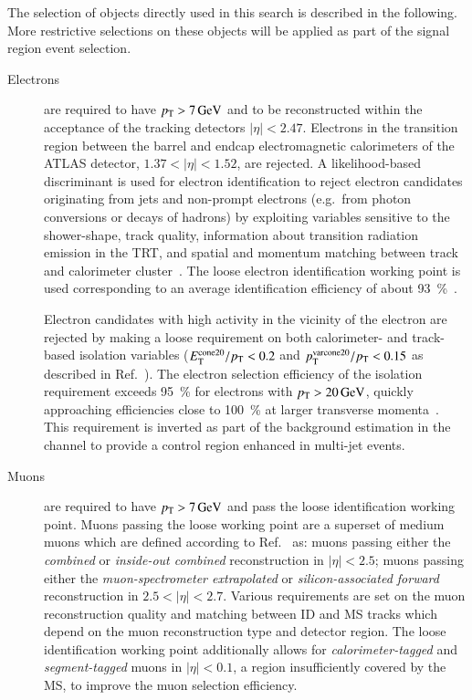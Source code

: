 The selection of objects directly used in this search is described in
the following. More restrictive selections on these objects will be
applied as part of the signal region event selection.
\begin{description}

\item[Electrons] are required to have $\pT > \SI{7}{\GeV}$ and to be
  reconstructed within the acceptance of the tracking detectors
  $|\eta| < \num{2.47}$. Electrons in the transition region between
  the barrel and endcap electromagnetic calorimeters of the ATLAS
  detector, $1.37 < |\eta| < 1.52$, are rejected. A likelihood-based
  discriminant is used for electron identification to reject electron
  candidates originating from jets and non-prompt electrons (e.g.\
  from photon conversions or decays of hadrons) by exploiting
  variables sensitive to the shower-shape, track quality, information
  about transition radiation emission in the TRT, and spatial and
  momentum matching between track and calorimeter
  cluster~\cite{EGAM-2018-01}. The loose electron identification
  working point is used corresponding to an average identification
  efficiency of about \SI{93}{\percent}~\cite{EGAM-2018-01}.

  Electron candidates with high activity in the vicinity of the
  electron are rejected by making a loose requirement on both
  calorimeter- and track-based isolation variables
  ($E_{\text{T}}^\text{cone20} / p_{\text{T}} < 0.2$ and
  $p_{\text{T}}^{\text{varcone20}}/ p_{\text{T}} < 0.15$ as described in
  Ref.~\cite{EGAM-2018-01}). The electron selection efficiency of the
  isolation requirement exceeds \SI{95}{\percent} for electrons with
  $\pT > \SI{20}{\GeV}$, quickly approaching efficiencies close to
  \SI{100}{\percent} at larger transverse
  momenta~\cite{EGAM-2018-01}. This requirement is inverted as part of
  the \faketauhadvis background estimation in the \lephad channel to
  provide a control region enhanced in multi-jet events.



\item[Muons] are required to have $\pT > \SI{7}{\GeV}$ and pass the
  loose identification working point. Muons passing the loose working
  point are a superset of medium muons which are defined according to
  Ref.~\cite{MUON-2018-03} as: muons passing either the
  \emph{combined} or \emph{inside-out combined} reconstruction in
  $|\eta| < 2.5$; muons passing either the \emph{muon-spectrometer
    extrapolated} or \emph{silicon-associated forward} reconstruction
  in $2.5 < |\eta| < 2.7$. Various requirements are set on the muon
  reconstruction quality and matching between ID and MS tracks which
  depend on the muon reconstruction type and detector region. The
  loose identification working point additionally allows for
  \emph{calorimeter-tagged} and \emph{segment-tagged} muons in
  $|\eta| < 0.1$, a region insufficiently covered by the MS, to
  improve the muon selection efficiency.


\end{description}
